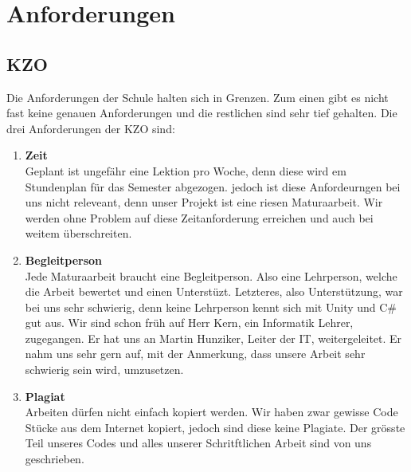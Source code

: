 \chapter{Anforderungen}

\section{KZO}
Die Anforderungen der Schule halten sich in Grenzen. Zum einen gibt es nicht fast keine
genauen Anforderungen und die restlichen sind sehr tief gehalten. Die drei Anforderungen der KZO sind:
\begin{enumerate}
    \item \textbf{Zeit} \\
        Geplant ist ungefähr eine Lektion pro Woche, denn diese wird em Stundenplan für das Semester abgezogen.
        jedoch ist diese Anfordeurngen bei uns nicht releveant, denn unser Projekt ist eine riesen Maturaarbeit.
        Wir werden ohne Problem auf diese Zeitanforderung erreichen und auch bei weitem überschreiten.
    \item \textbf{Begleitperson} \\
        Jede Maturaarbeit braucht eine Begleitperson. Also eine Lehrperson, welche die Arbeit bewertet und einen Unterstüzt.
        Letzteres, also Unterstützung, war bei uns sehr schwierig, denn keine Lehrperson kennt sich mit Unity und C\# gut aus.
        Wir sind schon früh auf Herr Kern, ein Informatik Lehrer, zugegangen.
        Er hat uns an Martin Hunziker, Leiter der IT, weitergeleitet. Er nahm uns sehr gern auf, mit der Anmerkung, dass unsere Arbeit sehr schwierig sein wird, umzusetzen.
    \item \textbf{Plagiat} \\
        Arbeiten dürfen nicht einfach kopiert werden. Wir haben zwar gewisse Code Stücke aus dem Internet kopiert, jedoch sind diese keine Plagiate.
        Der grösste Teil unseres Codes und alles unserer Schritftlichen Arbeit sind von uns geschrieben.
\end{enumerate}

